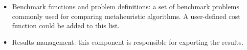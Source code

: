 \documentclass[landscape,a0paper,fontscale=0.22]{baposter} %
\begin{document}
\begin{poster}
{\begin{itemize}
\item Benchmark functions and problem definitions: a set of benchmark problems commonly used for comparing metaheuristic algorithms. A user-defined cost function could be added to this list.

\item Results management: this component is responsible for exporting the results.

\end{itemize}}




\end{poster}
\end{document}
